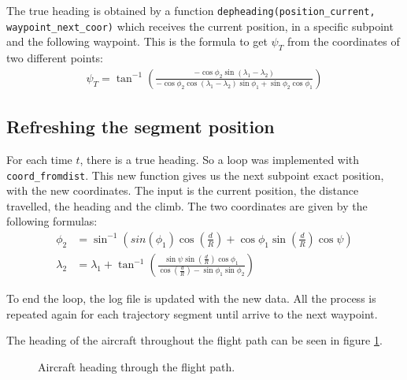 \documentclass{article}
\begin{document}
The true heading is obtained by a function \texttt{depheading(position_current, waypoint_next_coor)} which receives the current position, in a specific subpoint and the following waypoint. This is the formula to get $\psi_T$ from the coordinates of two different points: 
\begin{gather*}
    \psi_T = \tan^{-1}\left(\frac{-\cos\phi_2\sin(\lambda_1 - \lambda_2)}{-\cos\phi_2\cos(\lambda_1 - \lambda_2)\sin\phi_1 + \sin\phi_2\cos\phi_1}\right)
\end{gather*} 

\subsection{Refreshing the segment position}

For each time $t$, there is a true heading. So a loop was implemented with \texttt{coord_fromdist}. This new function gives us the next subpoint exact position, with the new coordinates. The input is the current position, the distance travelled, the heading and the climb. The two coordinates are given by the following formulas:
\begin{align*}
    \phi_2 &= \sin^{-1}\left(sin(\phi_1)\cos\left(\frac{d}{R}\right) + \cos\phi_1\sin\left(\frac{d}{R}\right)\cos\psi\right) \\
    \lambda_2 &= \lambda_1 + \tan^{-1}\left(\frac{\sin\psi\sin\left(\frac{d}{R}\right)\cos\phi_1}{\cos\left(\frac{d}{R}\right) - \sin\phi_1\sin\phi_2}\right)
\end{align*}  

To end the loop, the log file is updated with the new data. All the process is repeated again for each trajectory segment until arrive to the next waypoint.

The heading of the aircraft throughout the flight path can be seen in figure \ref{fig:heading}.
\begin{figure}[ht]
    \centering
    \caption{Aircraft heading through the flight path.}
    \label{fig:heading}
\end{figure}
\end{document}
